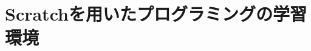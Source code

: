 \documentclass[11pt,dvipdfmx]{jreport}
\begin{document}


\chapter{Scratchを用いたプログラミングの学習環境}
\end{document}
